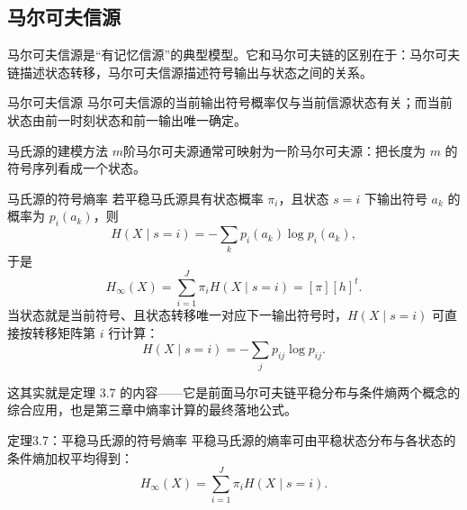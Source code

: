 \subsection{马尔可夫信源}

马尔可夫信源是“有记忆信源”的典型模型。它和马尔可夫链的区别在于：马尔可夫链描述状态转移，马尔可夫信源描述符号输出与状态之间的关系。

\begin{definitionBox}{马尔可夫信源}
马尔可夫信源的当前输出符号概率仅与当前信源状态有关；而当前状态由前一时刻状态和前一输出唯一确定。
\end{definitionBox}

\begin{keypoint}{马氏源的建模方法}
$m$阶马尔可夫源通常可映射为一阶马尔可夫源：把长度为 $m$ 的符号序列看成一个状态。
\end{keypoint}

\begin{formulaBox}{马氏源的符号熵率}
若平稳马氏源具有状态概率 $\pi_i$，且状态 $s=i$ 下输出符号 $a_k$ 的概率为 $p_i(a_k)$，则
\[
 H(X\mid s=i)=-\sum_k p_i(a_k)\log p_i(a_k),
\]
于是
\[
 H_\infty(X)=\sum_{i=1}^J \pi_i H(X\mid s=i)=[\pi][h]^t.
\]
当状态就是当前符号、且状态转移唯一对应下一输出符号时，$H(X\mid s=i)$ 可直接按转移矩阵第 $i$ 行计算：
\[
 H(X\mid s=i)=-\sum_j p_{ij}\log p_{ij}.
\]
\end{formulaBox}

这其实就是定理 3.7 的内容——它是前面马尔可夫链平稳分布与条件熵两个概念的综合应用，也是第三章中熵率计算的最终落地公式。

\begin{theoremBox}{定理3.7：平稳马氏源的符号熵率}
平稳马氏源的熵率可由平稳状态分布与各状态的条件熵加权平均得到：
\[
 H_\infty(X)=\sum_{i=1}^J \pi_i H(X\mid s=i).
\]
\end{theoremBox}

